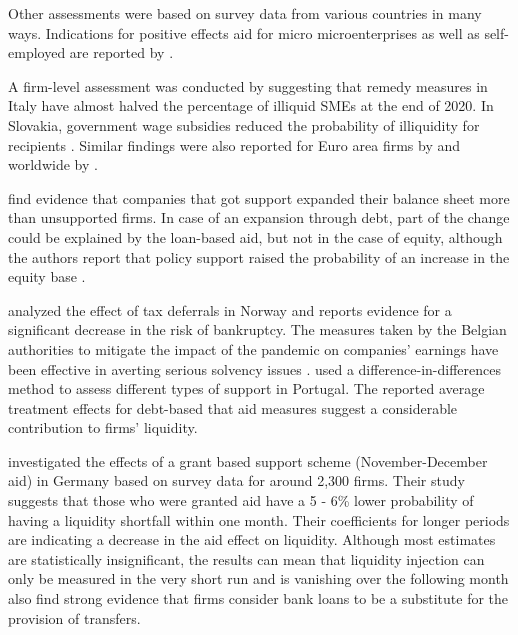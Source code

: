 Other assessments were based on survey data from various countries in many ways. Indications for positive effects aid for micro microenterprises as well as self-employed are reported by \parencite{kochaniak_effectiveness_2023,bertschek_german_2022}.

A firm-level assessment was conducted by \parencite{bellucci_consequences_2022} suggesting that remedy measures in Italy have almost halved the percentage of illiquid SMEs at the end of 2020. 
In Slovakia, government wage subsidies reduced the probability of illiquidity for recipients \parencite{lalinsky_distribution_2021}.
Similar findings were also reported for Euro area firms by \parencite{de_santis_impact_2021} and worldwide by \parencite{igan_shot_2023}.

\parencite{harasztosi_firm-level_2022} find evidence that companies that got support expanded their balance sheet more than unsupported firms. In case of an expansion through debt, part of the change could be explained by the loan-based aid, but not in the case of equity, although the authors report that policy support raised the probability of an increase in the equity base \parencite{harasztosi_firm-level_2022}.

\parencite{stien_covid-19_2022} analyzed the effect of tax deferrals in Norway and reports evidence for a significant decrease in the risk of bankruptcy.
The measures taken by the Belgian authorities to mitigate the impact of the pandemic on companies' earnings have been effective in averting serious solvency issues \parencite{piette_how_2022}.
\parencite{costa_state-aids_2021} used a difference-in-differences method to assess different types of support in Portugal. The reported average treatment effects for debt-based that aid measures suggest a considerable contribution to firms' liquidity.

\parencite{marek_impact_2022} investigated the effects of a grant based support scheme (November-December aid) in Germany based on survey data for around 2,300 firms. Their study suggests that those who were granted aid have a 5 - 6\% lower probability of having a liquidity shortfall within one month. Their coefficients for longer periods are indicating a decrease in the aid effect on liquidity. Although most estimates are statistically insignificant, the results can mean that liquidity injection can only be measured in the very short run and is vanishing over the following month \parencite{marek_impact_2022} also find strong evidence that firms consider bank loans to be a substitute for the provision of transfers.

